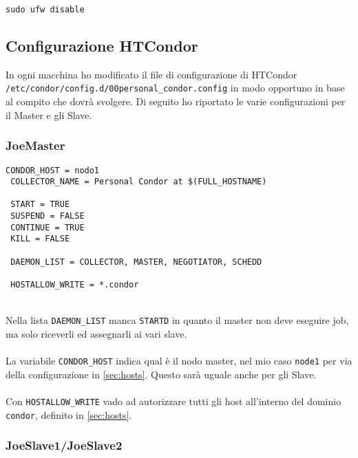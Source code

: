 \begin{lstlisting}[style=cmd]
 sudo ufw disable
\end{lstlisting}

\subsection{Configurazione HTCondor}

In ogni macchina ho modificato il file di configurazione di HTCondor \lstinline[style=cmd]|/etc/condor/config.d/00personal_condor.config| in modo opportuno in base al compito che dovr\`{a} svolgere. Di seguito ho riportato le varie configurazioni per il Master e gli Slave.


\subsubsection{JoeMaster}

\begin{lstlisting}[style=cmd]
 CONDOR_HOST = nodo1
 COLLECTOR_NAME = Personal Condor at $(FULL_HOSTNAME)
 
 START = TRUE
 SUSPEND = FALSE
 CONTINUE = TRUE
 KILL = FALSE
 
 DAEMON_LIST = COLLECTOR, MASTER, NEGOTIATOR, SCHEDD
 
 HOSTALLOW_WRITE = *.condor
\end{lstlisting}
\ \\
Nella lista \lstinline[style=cmd]|DAEMON_LIST| manca \lstinline[style=cmd]|STARTD| in quanto il master non deve eseguire job, ma solo riceverli ed assegnarli ai vari slave.\\
\ \\
La variabile \lstinline[style=cmd]|CONDOR_HOST| indica qual \`{e} il nodo master, nel mio caso \lstinline[style=cmd]|node1| per via della configurazione in \autoref{sec:hosts}. Questo sar\`{a} uguale anche per gli Slave.\\
\ \\
Con \lstinline[style=cmd]|HOSTALLOW_WRITE| vado ad autorizzare tutti gli host all'interno del dominio \lstinline[style=cmd]|condor|, definito in \autoref{sec:hosts}.
	
\subsubsection{JoeSlave1/JoeSlave2}
\label{sec:joeslave}

